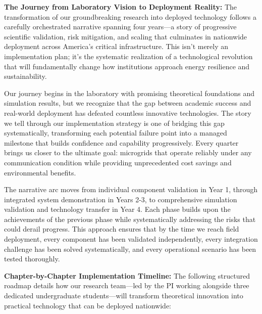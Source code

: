 \documentclass[12pt]{article}
\begin{document}
\textbf{The Journey from Laboratory Vision to Deployment Reality:} The transformation of our groundbreaking research into deployed technology follows a carefully orchestrated narrative spanning four years—a story of progressive scientific validation, risk mitigation, and scaling that culminates in nationwide deployment across America's critical infrastructure. This isn't merely an implementation plan; it's the systematic realization of a technological revolution that will fundamentally change how institutions approach energy resilience and sustainability.

Our journey begins in the laboratory with promising theoretical foundations and simulation results, but we recognize that the gap between academic success and real-world deployment has defeated countless innovative technologies. The story we tell through our implementation strategy is one of bridging this gap systematically, transforming each potential failure point into a managed milestone that builds confidence and capability progressively. Every quarter brings us closer to the ultimate goal: microgrids that operate reliably under any communication condition while providing unprecedented cost savings and environmental benefits.

The narrative arc moves from individual component validation in Year 1, through integrated system demonstration in Years 2-3, to comprehensive simulation validation and technology transfer in Year 4. Each phase builds upon the achievements of the previous phase while systematically addressing the risks that could derail progress. This approach ensures that by the time we reach field deployment, every component has been validated independently, every integration challenge has been solved systematically, and every operational scenario has been tested thoroughly.

\textbf{Chapter-by-Chapter Implementation Timeline:} The following structured roadmap details how our research team—led by the PI working alongside three dedicated undergraduate students—will transform theoretical innovation into practical technology that can be deployed nationwide:
\end{document}

